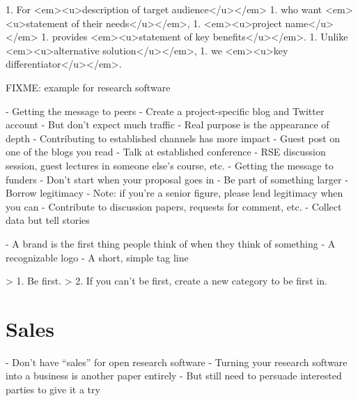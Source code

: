 \documentclass[10pt,letterpaper]{article}
\begin{document}
1. For <em><u>description of target audience</u></em>
1. who want <em><u>statement of their needs</u></em>,
1. <em><u>project name</u></em>
1. provides <em><u>statement of key benefits</u></em>.
1. Unlike <em><u>alternative solution</u></em>,
1. we <em><u>key differentiator</u></em>.

FIXME: example for research software

- Getting the message to peers
  - Create a project-specific blog and Twitter account
    - But don't expect much traffic
    - Real purpose is the appearance of depth
  - Contributing to established channels has more impact
    - Guest post on one of the blogs you read
    - Talk at established conference
    - RSE discussion session,
      guest lectures in someone else's course,
      etc.
- Getting the message to funders
  - Don't start when your proposal goes in
  - Be part of something larger
    - Borrow legitimacy
    - Note: if you're a senior figure, please lend legitimacy when you can
- Contribute to discussion papers, requests for comment, etc.
- Collect data but tell stories

- A brand is the first thing people think of when they think of something
  - A recognizable logo
  - A short, simple tag line

> 1. Be first.
> 2. If you can't be first, create a new category to be first in.

\section{Sales}

- Don't have ``sales'' for open research software
  - Turning your research software into a business is another paper entirely
- But still need to persuade interested parties to give it a try
\end{document}
